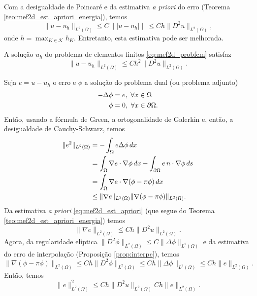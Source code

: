 Com a desigualdade de Poincaré e da estimativa {\it a priori} do erro (Teorema \ref{teo:mef2d_est_apriori_energia}), temos
\begin{equation}\label{eq:mef2d_est_apriori}
  \|u-u_h\|_{L^2(\Omega)} \leq C \||u-u_h|\| \leq Ch\|D^2u\|_{L^2(\Omega)},
\end{equation}
onde $h = \max_{K\in\mathcal{K}} h_K$. Entretanto, esta estimativa pode ser melhorada.

\begin{teo}
  A solução $u_h$ do problema de elementos finitos \eqref{eq:mef2d_probfem} satisfaz
  \begin{equation}
    \|u-u_h\|_{L^2(\Omega)} \leq Ch^2\|D^2u\|_{L^2(\Omega)}.
  \end{equation}
\end{teo}
\begin{dem}
  Seja $e = u-u_h$ o erro e $\phi$ a solução do problema dual (ou problema adjunto)
  \begin{align}
    -\Delta \phi &= e,~\forall x\in\Omega\\
    \phi &= 0,~\forall x\in\partial\Omega.
  \end{align}
Então, usando a fórmula de Green, a ortogonalidade de Galerkin e, então, a desigualdade de Cauchy-Schwarz, temos
\begin{align}
  \|e^2\|_{L^2(\Omega)} &= -\int_\Omega e\Delta\phi\,dx\\
  &=\int_\Omega \nabla e\cdot\nabla\phi\,dx - \int_{\partial\Omega} e\,n\cdot\nabla \phi\,ds\\
  &=\int_\Omega \nabla e\cdot\nabla(\phi-\pi\phi)\,dx\\
  &\leq\|\nabla e\|_{L^2(\Omega)}\|\nabla(\phi-\pi\phi)\|_{L^2(\Omega)}.
\end{align}
Da estimativa {\it a priori} \eqref{eq:mef2d_est_apriori} (que segue do Teorema \ref{teo:mef2d_est_apriori_energia}) temos
\begin{equation}
  \|\nabla e\|_{L^2(\Omega)} \leq Ch\|D^2u\|_{L^2(\Omega)}.
\end{equation}
Agora, da regularidade elíptica $\|D^2\phi\|_{L^2(\Omega)} \leq C\|\Delta\phi\|_{L^2(\Omega)}$ \cite{Evans1998a} e da estimativa do erro de interpolação (Proposição \ref{prop:interpc}), temos
\begin{equation}
  \|\nabla(\phi-\pi\phi)\|_{L^2(\Omega)} \leq Ch\|D^2\phi\|_{L^2(\Omega)}\leq Ch\|\Delta\phi\|_{L^2(\Omega)} \leq Ch\|e\|_{L^2(\Omega)}.
\end{equation}
Então, temos
\begin{equation}
  \|e\|_{L^2(\Omega)}^2 \leq Ch\|D^2u\|_{L^2(\Omega)}Ch\|e\|_{L^2(\Omega)}.
\end{equation}
\end{dem}

